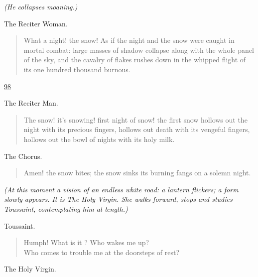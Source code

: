 \documentclass[letterpaper,article,12pt,oneside,notitlepage]{memoir}
\begin{document}
\textit{(He collapses moaning.)}

\begin{center}The Reciter Woman.\end{center}

\begin{verse}
What a night! the snow! As if the night and the snow were caught in mortal combat: large masses of shadow collapse along with the whole panel of the sky, and the cavalry of flakes rushes down in the whipped flight of its one hundred thousand burnous.  \\
\end{verse}

\clearpage

\href{http://cesaire.elotroalex.com/chiens/chiens/p098.html}{98}

\begin{center}The Reciter Man.\end{center}

\begin{verse}
The snow! it's snowing! first night of snow! the first snow hollows out the night with its precious fingers, hollows out death with its vengeful fingers, hollows out the bowl of nights with its holy milk.  \\
\end{verse}

\begin{center}The Chorus.\end{center}

\begin{verse}
Amen! the snow bites; the snow sinks its burning fangs on a solemn night.  \\
\end{verse}

\textit{(At this moment a vision of an endless white road: a lantern flickers; a form slowly appears. It is The Holy Virgin. She walks forward, stops and studies Toussaint, contemplating him at length.)}

\begin{center}Toussaint.\end{center}

\begin{verse}
Humph! What is it ? Who wakes me up? \\
Who comes to trouble me at the doorsteps of rest? \\
\end{verse}

\begin{center}The Holy Virgin.\end{center}
\end{document}
